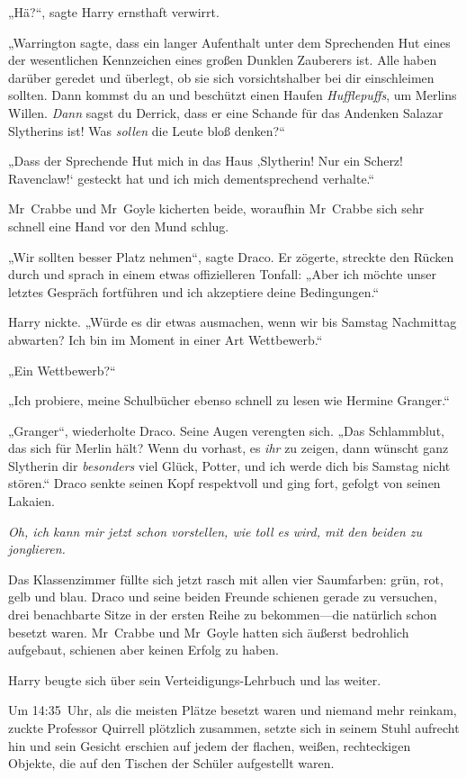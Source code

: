 {„Hä?“, sagte Harry ernsthaft verwirrt.

„Warrington sagte, dass ein langer Aufenthalt unter dem Sprechenden Hut eines der wesentlichen Kennzeichen eines großen Dunklen Zauberers ist. Alle haben darüber geredet und überlegt, ob sie sich vorsichtshalber bei dir einschleimen sollten. Dann kommst du an und beschützt einen Haufen \emph{Hufflepuffs}, um Merlins Willen. \emph{Dann} sagst du Derrick, dass er eine Schande für das Andenken Salazar Slytherins ist! Was \emph{sollen} die Leute bloß denken?“

„Dass der Sprechende Hut mich in das Haus ‚Slytherin! Nur ein Scherz! Ravenclaw!` gesteckt hat und ich mich dementsprechend verhalte.“

Mr~Crabbe und Mr~Goyle kicherten beide, woraufhin Mr~Crabbe sich sehr schnell eine Hand vor den Mund schlug.

„Wir sollten besser Platz nehmen“, sagte Draco. Er zögerte, streckte den Rücken durch und sprach in einem etwas offizielleren Tonfall: „Aber ich möchte unser letztes Gespräch fortführen und ich akzeptiere deine Bedingungen.“

Harry nickte. „Würde es dir etwas ausmachen, wenn wir bis Samstag Nachmittag abwarten? Ich bin im Moment in einer Art Wettbewerb.“

„Ein Wettbewerb?“

„Ich probiere, meine Schulbücher ebenso schnell zu lesen wie Hermine Granger.“

„Granger“, wiederholte Draco. Seine Augen verengten sich. „Das Schlammblut, das sich für Merlin hält? Wenn du vorhast, es \emph{ihr} zu zeigen, dann wünscht ganz Slytherin dir \emph{besonders} viel Glück, Potter, und ich werde dich bis Samstag nicht stören.“ Draco senkte seinen Kopf respektvoll und ging fort, gefolgt von seinen Lakaien.

\emph{Oh, ich kann mir jetzt schon vorstellen, wie toll es wird, mit den beiden zu jonglieren.}

Das Klassenzimmer füllte sich jetzt rasch mit allen vier Saumfarben: grün, rot, gelb und blau. Draco und seine beiden Freunde schienen gerade zu versuchen, drei benachbarte Sitze in der ersten Reihe zu bekommen—die natürlich schon besetzt waren. Mr~Crabbe und Mr~Goyle hatten sich äußerst bedrohlich aufgebaut, schienen aber keinen Erfolg zu haben.

Harry beugte sich über sein Verteidigungs-Lehrbuch und las weiter.

\later

Um 14:35~Uhr, als die meisten Plätze besetzt waren und niemand mehr reinkam, zuckte Professor Quirrell plötzlich zusammen, setzte sich in seinem Stuhl aufrecht hin und sein Gesicht erschien auf jedem der flachen, weißen, rechteckigen Objekte, die auf den Tischen der Schüler aufgestellt waren.

}

